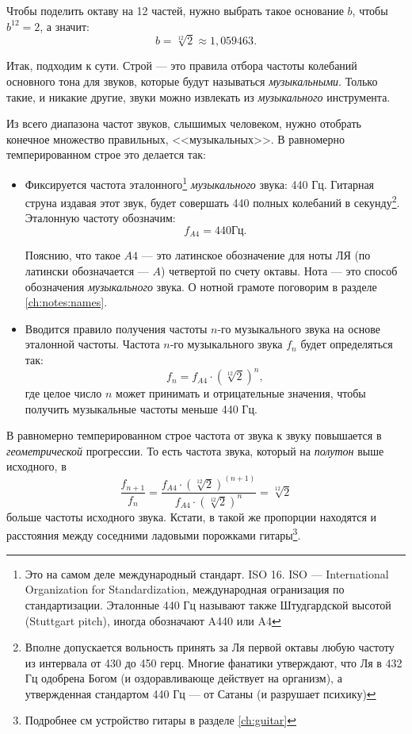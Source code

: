 Чтобы поделить октаву на 12 частей, нужно выбрать такое основание $b$, чтобы $b^{12} = 2$, а значит:
\[
    b = \sqrt[12]{2} \approx 1,059463.
\]

Итак, подходим к сути. Строй --- это правила отбора частоты колебаний основного тона для звуков, которые будут называться \emph{музыкальными}. Только такие, и никакие другие, звуки можно извлекать из \emph{музыкального} инструмента.

Из всего диапазона частот звуков, слышимых человеком, нужно отобрать конечное множество правильных, <<музыкальных>>. В равномерно темперированном строе это делается так:
\begin{itemize}
    \item Фиксируется частота эталонного\footnote{Это на самом деле международный стандарт. ISO 16. ISO --- International Organization for Standardization, международная огранизация по стандартизации. Эталонные 440 Гц называют также Штудгардской высотой (Stuttgart pitch), иногда обозначают A440 или A4} \emph{музыкального} звука: 440 Гц. Гитарная струна издавая этот звук, будет совершать 440 полных колебаний в секунду\footnote{Вполне допускается вольность принять за Ля первой октавы любую частоту из интервала от 430 до 450 герц. Многие фанатики утверждают, что Ля в 432 Гц одобрена Богом (и оздоравливающе действует на организм), а утвержденная стандартом 440 Гц --- от Сатаны (и разрушает психику)}. Эталонную частоту обозначим: 
    \[  
        f_{A4}=440\text{Гц}.
    \]
    
    Пояснию, что такое $A4$ --- это латинское обозначение для ноты ЛЯ (по латински обозначается --- $A$) четвертой по счету октавы. Нота --- это способ обозначения \emph{музыкального} звука. О нотной грамоте поговорим в разделе \ref{ch:notes:names}.
    
    \item Вводится правило получения частоты $n$-го музыкального звука на основе эталонной частоты. Частота $n$-го музыкального звука $f_n$ будет определяться так: 
    \begin{equation}
        f_n = f_{A4}\cdot({\sqrt[12]{2}})^n, \label{eq:music:tone:frequency}
    \end{equation}
    где целое число $n$ может принимать и отрицательные значения, чтобы получить музыкальные частоты меньше 440 Гц.
\end{itemize}

В равномерно темперированном строе частота от звука к звуку повышается в \emph{геометрической} прогрессии. То есть частота звука, который на \emph{полутон} выше исходного, в 
\[
    \frac{f_{n+1}}{f_n} = \frac{f_{A4}\cdot(\sqrt[12]{2})^{(n+1)}}{f_{A4}\cdot(\sqrt[12]{2})^n} = \sqrt[12]{2}
\] 
больше частоты исходного звука. Кстати, в такой же пропорции находятся и расстояния между соседними ладовыми порожками гитары\footnote{Подробнее см устройство гитары в разделе \ref{ch:guitar}}.

